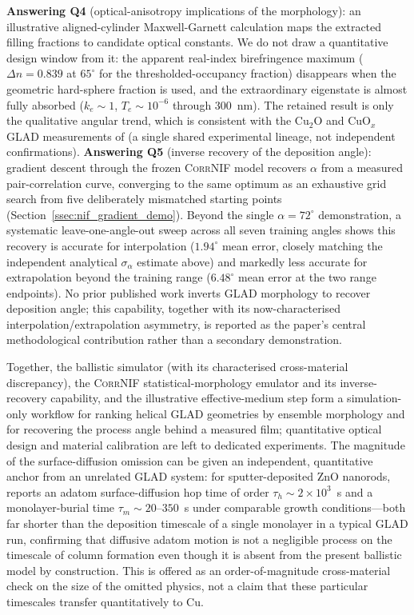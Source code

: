 \documentclass[aip,amsmath,amssymb,reprint]{revtex4-1}
\newcommand{\dang}{\ensuremath{\alpha}}
\begin{document}
\textbf{Answering Q4} (optical-anisotropy implications of the morphology):
an illustrative aligned-cylinder Maxwell-Garnett calculation maps the
extracted filling fractions to candidate optical constants.  We do not draw
a quantitative design window from it: the apparent real-index birefringence
maximum ($\Delta n = 0.839$ at $65^{\circ}$ for the thresholded-occupancy
fraction) disappears when the geometric hard-sphere fraction is used, and the
extraordinary eigenstate is almost fully absorbed ($k_e \sim 1$,
$T_e \sim 10^{-6}$ through \SI{300}{nm}).  The retained result is only the
qualitative angular trend, which is consistent with the Cu$_2$O and CuO$_x$
GLAD measurements of \citet{chaffar2018,chaffar2019} (a single shared
experimental lineage, not independent confirmations).
\textbf{Answering Q5} (inverse recovery of the deposition angle): gradient
descent through the frozen \textsc{CorrNIF} model recovers $\dang$ from a
measured pair-correlation curve, converging to the same optimum as an
exhaustive grid search from five deliberately mismatched starting points
(Section~\ref{ssec:nif_gradient_demo}). Beyond the single $\dang=72^{\circ}$
demonstration, a systematic leave-one-angle-out sweep across all seven
training angles shows this recovery is accurate for interpolation
($1.94^{\circ}$ mean error, closely matching the independent analytical
$\sigma_{\dang}$ estimate above) and markedly less accurate for extrapolation
beyond the training range ($6.48^{\circ}$ mean error at the two range
endpoints). No prior published work inverts GLAD morphology to recover
deposition angle; this capability, together with its now-characterised
interpolation/extrapolation asymmetry, is reported as the paper's central
methodological contribution rather than a secondary demonstration.

Together, the ballistic simulator (with its characterised cross-material
discrepancy), the \textsc{CorrNIF} statistical-morphology emulator and its
inverse-recovery capability, and the illustrative effective-medium step form
a simulation-only workflow for ranking helical GLAD geometries by ensemble
morphology and for recovering the process angle behind a measured film;
quantitative optical design and material calibration are left to dedicated
experiments.
The magnitude of the surface-diffusion omission can be given an independent, quantitative anchor from an unrelated GLAD system: for sputter-deposited ZnO nanorods, \citet{laforge2014} reports an adatom surface-diffusion hop time of order $\tau_h \sim 2\times10^{3}$~s and a monolayer-burial time $\tau_m \sim 20$--$350$~s under comparable growth conditions---both far shorter than the deposition timescale of a single monolayer in a typical GLAD run, confirming that diffusive adatom motion is not a negligible process on the timescale of column formation even though it is absent from the present ballistic model by construction. This is offered as an order-of-magnitude cross-material check on the size of the omitted physics, not a claim that these particular timescales transfer quantitatively to Cu.
\end{document}
